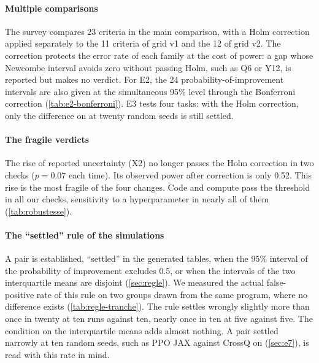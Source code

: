 \paragraph{Multiple comparisons} The survey compares 23 criteria in the main comparison, with a Holm
correction applied separately to the 11 criteria of grid v1 and the 12 of grid v2. The correction
protects the error rate of each family at the cost of power: a gap whose Newcombe interval avoids
zero without passing Holm, such as Q6 or Y12, is reported but makes no verdict. For E2, the 24
probability-of-improvement intervals are also given at the simultaneous 95\% level through the
Bonferroni correction (\cref{tab:e2-bonferroni}). E3 tests four tasks: with
the Holm correction, only the difference on  at twenty random seeds
is still settled.

\paragraph{The fragile verdicts} The rise of reported uncertainty (X2) no longer passes the Holm
correction in two checks ($p = 0.07$ each time). Its observed power after correction is only 0.52.
This rise is the most fragile of the four changes. Code and compute pass the
threshold in all our checks, sensitivity to a hyperparameter in nearly all of them
(\cref{tab:robustesse}).

\paragraph{The \enquote{settled} rule of the simulations} A pair is established, \enquote{settled} in
the generated tables, when the 95\% interval of the probability of improvement excludes 0.5, or when the intervals of the two
interquartile means are disjoint (\cref{sec:regle}). We measured the actual false-positive rate of
this rule on two groups drawn from the same program, where no difference exists
(\cref{tab:regle-tranche}). The rule settles wrongly slightly more than once in
twenty at ten runs against ten, nearly once in ten at five against five. The condition on the
interquartile means adds almost nothing. A pair settled narrowly at ten random seeds, such as PPO
JAX against CrossQ on  (\cref{sec:e7}), is read with this rate in mind.

